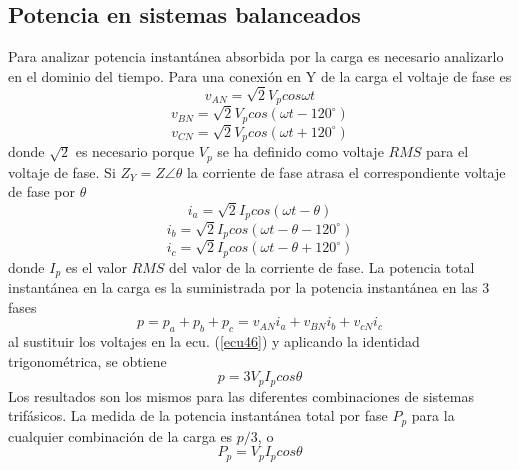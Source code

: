 \documentclass[twocolumn]{IEEEtran}
\begin{document}
\subsection{Potencia en sistemas balanceados}
\noindent
Para analizar potencia instantánea absorbida por la carga es necesario analizarlo en el dominio del tiempo. Para una conexión en Y de la carga el voltaje de fase es
\begin{equation}
 v_{AN} = \sqrt{2}V_p cos \omega t
\label{ecu40}
\end{equation}
\begin{equation}
 v_{BN} = \sqrt{2}V_p cos( \omega t -120 ^\circ)
\label{ecu41}
\end{equation}
\begin{equation}
 v_{CN} = \sqrt{2}V_p cos( \omega t +120 ^\circ)
\label{ecu42}
\end{equation}
\noindent
donde $\sqrt{2}$ es necesario porque $V_p$ se ha definido como voltaje $RMS$ para el voltaje de fase. Si $Z_Y = Z \angle \theta$ la corriente de fase atrasa el correspondiente voltaje de fase por $\theta$
\begin{equation}
 i_a= \sqrt{2} I_p cos (\omega t - \theta)
\label{ecu43}
\end{equation}
\begin{equation}
 i_b= \sqrt{2} I_p cos (\omega t - \theta - 120 ^ \circ)
\label{ecu44}
\end{equation}
\begin{equation}
 i_c= \sqrt{2} I_p cos (\omega t - \theta + 120 ^ \circ)
\label{ecu45}
\end{equation}
\noindent
donde $I_p$ es el valor $RMS$ del valor de la corriente de fase. La potencia total instantánea en la carga es la suministrada por la potencia instantánea en las $3$ fases
\begin{equation}
 p = p _a + p_b + p_c = v_{AN} i_a +v_{BN} i_b + v_{cN} i_c
\label{ecu46}
\end{equation}
\noindent
al sustituir los voltajes en la ecu. (\ref{ecu46}) y aplicando la identidad trigonométrica, se obtiene
\begin{equation}
 p = 3 V_p I_p cos \theta
\label{ecu47}
\end{equation}
\noindent
Los resultados son los mismos para las diferentes combinaciones de sistemas trifásicos. La medida de la potencia instantánea total por fase $P_p$ para la cualquier combinación de la carga es $p/3$, o
\begin{equation}
 P_p = V_p I_p cos \theta
\label{ecu48}
\end{equation}
\end{document}
